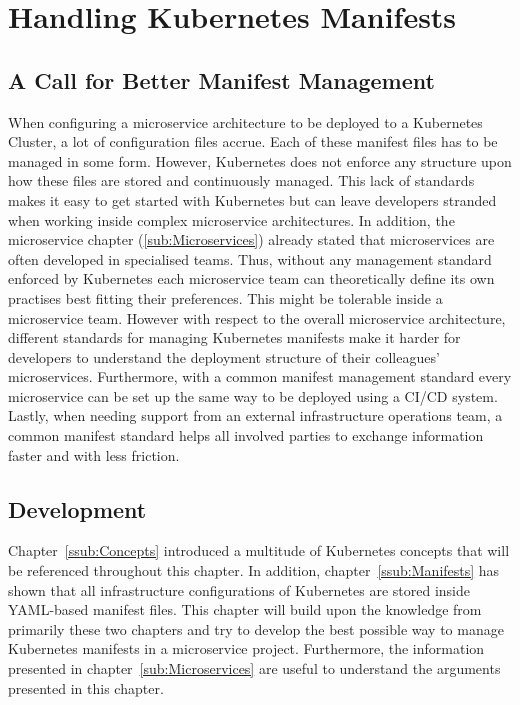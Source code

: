 
\section{Handling Kubernetes Manifests}%
\label{sec:Handling_Kubernetes_Manifests}

\subsection{A Call for Better Manifest Management}%
\label{sub:A_Call_for_Better_Manifest_Management}
When configuring a microservice architecture to be deployed to a Kubernetes
Cluster, a lot of configuration files accrue. Each of these manifest files has
to be managed in some form. However, Kubernetes does not enforce any structure
upon how these files are stored and continuously managed. This lack of
standards makes it easy to get started with Kubernetes but can leave developers
stranded when working inside complex microservice architectures. In addition,
the microservice chapter (\ref{sub:Microservices}) already stated that
microservices are often developed in specialised teams. Thus, without any
management standard enforced by Kubernetes each microservice team can
theoretically define its own practises best fitting their preferences. This
might be tolerable inside a microservice team. However with respect to the
overall microservice architecture, different standards for managing Kubernetes
manifests make it harder for developers to understand the deployment structure
of their colleagues' microservices. Furthermore, with a common manifest
management standard every microservice can be set up the same way to be
deployed using a \ac{CI}/\ac{CD} system. Lastly, when needing support from an
external infrastructure operations team, a common manifest standard helps all
involved parties to exchange information faster and with less friction.

\subsection{Development}%
\label{sub:Development}
Chapter~\ref{ssub:Concepts} introduced a multitude of Kubernetes concepts that
will be referenced throughout this chapter. In addition,
chapter~\ref{ssub:Manifests} has shown that all infrastructure configurations of
Kubernetes are stored inside YAML-based manifest files. This chapter will build
upon the knowledge from primarily these two chapters and try to develop the
best possible way to manage Kubernetes manifests in a microservice project.
Furthermore, the information presented in chapter~\ref{sub:Microservices} are
useful to understand the arguments presented in this chapter.

